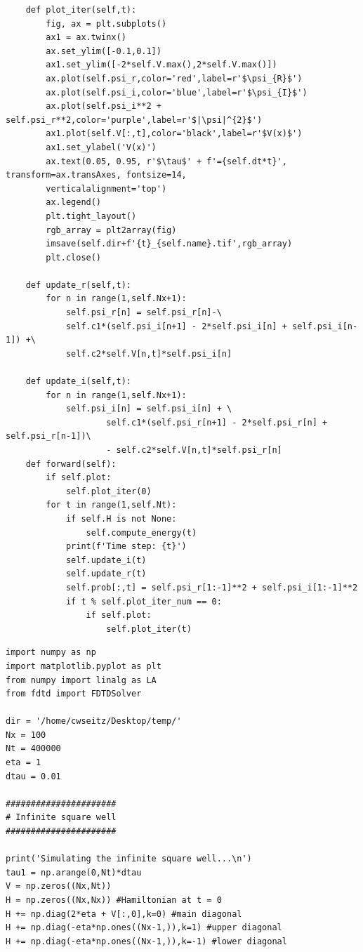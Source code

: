 \documentclass[12pt]{article}
\theoremstyle{definition}
\begin{document}
{\begin{lstlisting}
    def plot_iter(self,t):
        fig, ax = plt.subplots()
        ax1 = ax.twinx()
        ax.set_ylim([-0.1,0.1])
        ax1.set_ylim([-2*self.V.max(),2*self.V.max()])
        ax.plot(self.psi_r,color='red',label=r'$\psi_{R}$')
        ax.plot(self.psi_i,color='blue',label=r'$\psi_{I}$')
        ax.plot(self.psi_i**2 + self.psi_r**2,color='purple',label=r'$|\psi|^{2}$')
        ax1.plot(self.V[:,t],color='black',label=r'$V(x)$')
        ax1.set_ylabel('V(x)')
        ax.text(0.05, 0.95, r'$\tau$' + f'={self.dt*t}', transform=ax.transAxes, fontsize=14,
        verticalalignment='top')
        ax.legend()
        plt.tight_layout()
        rgb_array = plt2array(fig)
        imsave(self.dir+f'{t}_{self.name}.tif',rgb_array)
        plt.close()

    def update_r(self,t):
        for n in range(1,self.Nx+1):
            self.psi_r[n] = self.psi_r[n]-\
            self.c1*(self.psi_i[n+1] - 2*self.psi_i[n] + self.psi_i[n-1]) +\
            self.c2*self.V[n,t]*self.psi_i[n]

    def update_i(self,t):
        for n in range(1,self.Nx+1):
            self.psi_i[n] = self.psi_i[n] + \
                    self.c1*(self.psi_r[n+1] - 2*self.psi_r[n] + self.psi_r[n-1])\
                    - self.c2*self.V[n,t]*self.psi_r[n]
    def forward(self):
        if self.plot:
            self.plot_iter(0)
        for t in range(1,self.Nt):
            if self.H is not None:
                self.compute_energy(t)
            print(f'Time step: {t}')
            self.update_i(t)
            self.update_r(t)
            self.prob[:,t] = self.psi_r[1:-1]**2 + self.psi_i[1:-1]**2
            if t % self.plot_iter_num == 0:
                if self.plot:
                    self.plot_iter(t)

\end{lstlisting}

\begin{lstlisting}
import numpy as np
import matplotlib.pyplot as plt
from numpy import linalg as LA
from fdtd import FDTDSolver

dir = '/home/cwseitz/Desktop/temp/'
Nx = 100
Nt = 400000
eta = 1
dtau = 0.01

######################
# Infinite square well
######################

print('Simulating the infinite square well...\n')
tau1 = np.arange(0,Nt)*dtau
V = np.zeros((Nx,Nt))
H = np.zeros((Nx,Nx)) #Hamiltonian at t = 0
H += np.diag(2*eta + V[:,0],k=0) #main diagonal
H += np.diag(-eta*np.ones((Nx-1,)),k=1) #upper diagonal
H += np.diag(-eta*np.ones((Nx-1,)),k=-1) #lower diagonal


\end{lstlisting}}
\end{document}
